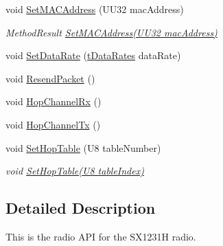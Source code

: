\begin{DoxyCompactItemize}
void \hyperlink{group___radio_ga70da240bdf435f229f9eb6045a418dba}{Set\-M\-A\-C\-Address} (U\-U32 mac\-Address)
\begin{DoxyCompactList}\small\item\em Method\-Result \hyperlink{group___radio_ga70da240bdf435f229f9eb6045a418dba}{Set\-M\-A\-C\-Address(\-U\-U32 mac\-Address)} \end{DoxyCompactList}\item 
void \hyperlink{group___radio_ga859abda5461f9370ecfa13165b7088ce}{Set\-Data\-Rate} (\hyperlink{group___radio_ga8ca09000106eab66e7f5a4998107f805}{t\-Data\-Rates} data\-Rate)
\item 
void \hyperlink{group___radio_ga95f238c518501c80a31b90d5e9f7c4dc}{Resend\-Packet} ()
\item 
void \hyperlink{group___radio_ga9774cc892671d34ecff74c538276cc9f}{Hop\-Channel\-Rx} ()
\item 
void \hyperlink{group___radio_ga92cebd918da04bf95b3ee415821358b5}{Hop\-Channel\-Tx} ()
\item 
void \hyperlink{group___radio_gae25f772e91044b5644349d607f3e48a3}{Set\-Hop\-Table} (U8 table\-Number)
\begin{DoxyCompactList}\small\item\em void \hyperlink{group___radio_gae25f772e91044b5644349d607f3e48a3}{Set\-Hop\-Table(\-U8 table\-Index)} \end{DoxyCompactList}\end{DoxyCompactItemize}


\subsection{Detailed Description}
This is the radio A\-P\-I for the S\-X1231\-H radio. 


